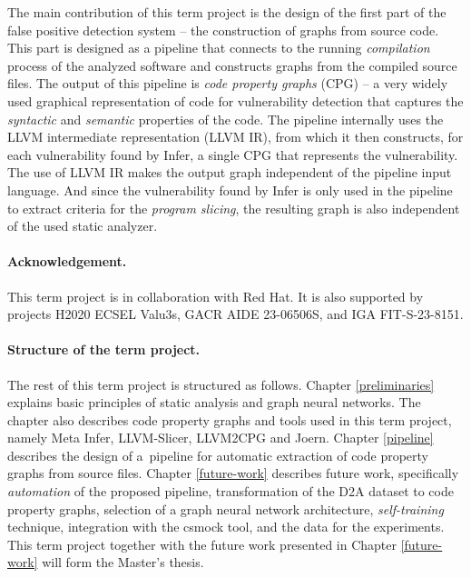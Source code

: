 The main contribution of this term project is the design of the first part of the false positive detection system -- the construction of graphs from source code. This part is designed as a pipeline that connects to the running \textit{compilation} process of the analyzed software and constructs graphs from the compiled source files. The output of this pipeline is \textit{code property graphs} (CPG) -- a very widely used graphical representation of code for vulnerability detection that captures the \textit{syntactic} and \textit{semantic} properties of the code. The pipeline internally uses the LLVM intermediate representation (LLVM IR), from which it then constructs, for each vulnerability found by Infer, a single CPG that represents the vulnerability. The use of LLVM IR makes the output graph independent of the pipeline input language. And since the vulnerability found by Infer is only used in the pipeline to extract criteria for the \textit{program slicing}, the resulting graph is also independent of the used static analyzer.


\paragraph{Acknowledgement.} This term project is in collaboration with Red Hat. It is also supported by projects H2020 ECSEL Valu3s, GACR AIDE 23-06506S, and IGA FIT-S-23-8151.

\paragraph{Structure of the term project.}
 The rest of this term project is structured as follows. Chapter \ref{preliminaries} explains basic principles of static analysis and graph neural networks. The chapter also describes code property graphs and tools used in this term project, namely Meta Infer, LLVM-Slicer, LLVM2CPG and Joern. Chapter \ref{pipeline} describes the design of a~pipeline for automatic extraction of code property graphs from source files. Chapter \ref{future-work} describes future work, specifically \textit{automation} of the proposed pipeline, transformation of the D2A dataset to code property graphs, selection of a graph neural network architecture, \textit{self-training} technique, integration with the csmock tool, and the data for the experiments. This term project together with the future work presented in Chapter \ref{future-work} will form the Master's thesis.


